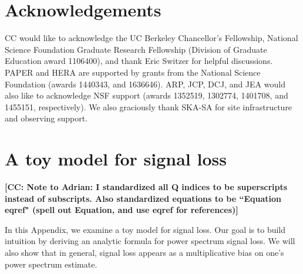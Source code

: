 \documentclass[preprint2,numberedappendix,tighten]{aastex6}  %
\newcommand{\cc}[1]{{\color{purple} \textbf{[CC: #1]}}}
\begin{document}

\section{Acknowledgements}
CC would like to acknowledge the UC Berkeley Chancellor's Fellowship, National Science Foundation Graduate Research Fellowship (Division of Graduate Education award 1106400), and thank Eric Switzer for helpful discussions. PAPER and HERA are supported by grants from the National Science Foundation (awards 1440343, and 1636646). ARP, JCP, DCJ, and JEA would also like to acknowledge NSF support (awards 1352519, 1302774, 1401708, and 1455151, respectively). We also graciously thank SKA-SA for site infrastructure and observing support.
\label{sec:Ack}


\appendix
\section{A toy model for signal loss}
\label{sec:sigloss_appendix}

\cc{Note to Adrian: I standardized all Q indices to be superscripts instead of subscripts. Also standardized equations to be ``Equation eqref" (spell out Equation, and use eqref for references)}

In this Appendix, we examine a toy model for signal loss. Our goal is to build intuition by deriving an analytic formula for power spectrum signal loss. We will also show that in general, signal loss appears as a multiplicative bias on one's power spectrum estimate.
\end{document}
